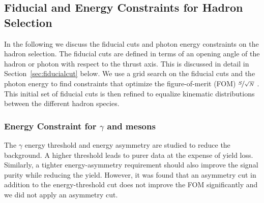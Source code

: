

\subsection{Fiducial and Energy Constraints for Hadron Selection}
\label{sec:fidAndEnergyCuts}
In the following we discuss the fiducial cuts and photon energy constraints on the hadron selection. The fiducial cuts are defined in terms of an opening angle of the hadron or photon with respect to the
thrust axis. This is discussed in detail in Section~\ref{sec:fiducialcut} below. We use a grid search on the fiducial cuts and the photon energy to find constraints that optimize the figure-of-merit (FOM) $\nicefrac{S}{\sqrt{N}}$ . This initial set of fiducial cuts is then refined to equalize kinematic distributions between the different hadron species.

\subsubsection{\texorpdfstring{Energy Constraint for $\gamma$ and mesons}{Energy Constraint for gamma and mesons}}
\label{sec:energyconstraint}


The $\gamma$ energy threshold and energy asymmetry are studied to reduce the background. A higher threshold leads to purer data at the expense of yield loss. Similarly, a tighter energy-asymmetry requirement should also improve the signal purity while reducing the yield. However, it was found that an asymmetry cut in addition to the energy-threshold cut does not improve the FOM significantly and we did not apply an asymmetry cut.

